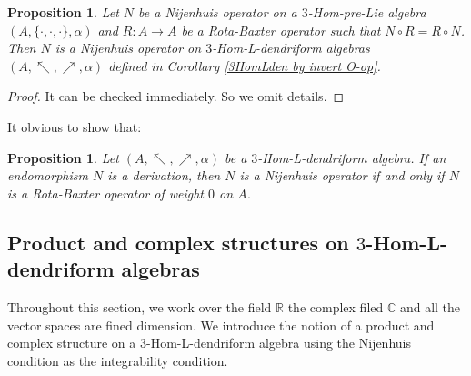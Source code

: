 \documentclass[a4paper,11pt]{article}
\def\nw{\nwarrow}
\def\ne{\nearrow}
\newtheorem{pro}[thm]{Proposition}
\theoremstyle{definition}
\begin{document}
\begin{pro}
Let $N$ be a Nijenhuis operator on a $3$-Hom-pre-Lie algebra  $(A,\{\cdot,\cdot,\cdot\},\alpha)$ and $R:A\to A$ be a Rota-Baxter operator such that $N\circ R=R\circ N$. Then $N$ is a  Nijenhuis operator on  $3$-Hom-L-dendriform algebras $(A,\nw,\ne,\alpha)$ defined in Corollary \ref{3HomLden by invert O-op}.


\end{pro}
\begin{proof}
It can be checked immediately. So we omit details.
\end{proof}
It obvious to show that:
\begin{pro}
Let $(A,\nw,\ne,\alpha)$ be a $3$-Hom-L-dendriform algebra. If an endomorphism $N$ is a derivation, then $N$ is a Nijenhuis operator if and only if  $N$ is a Rota-Baxter operator  of weight $0$ on $A$.
\end{pro}
\subsection{Product and complex structures on $3$-Hom-L-dendriform algebras}
Throughout  this section, we work over the field $\mathbb{R}$ the complex filed $\mathbb{C}$ and all the vector spaces are fined dimension. We  introduce the notion of a product and complex structure on a $3$-Hom-L-dendriform algebra using the Nijenhuis
condition as the integrability condition.
\end{document}
